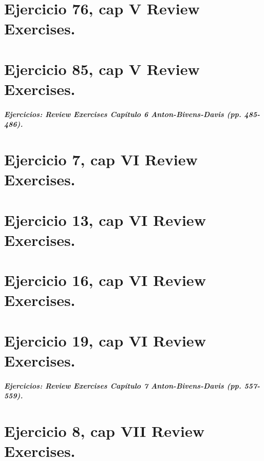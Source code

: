 \documentclass[11pt,letterpaper]{article}
\begin{document}
\section{Ejercicio 76, cap V Review Exercises.}

\section{Ejercicio 85, cap V Review Exercises.}




\subparagraph{Ejercicios: Review Exercises Capítulo 6 Anton-Bivens-Davis (pp. 485-486).}

\section{Ejercicio 7, cap VI Review Exercises.}

\section{Ejercicio 13, cap VI Review Exercises.}

\section{Ejercicio 16, cap VI Review Exercises.}

\section{Ejercicio 19, cap VI Review Exercises.}



\subparagraph{Ejercicios: Review Exercises Capítulo 7 Anton-Bivens-Davis (pp. 557-559).}

\section{Ejercicio 8, cap VII Review Exercises.}

\end{document}
